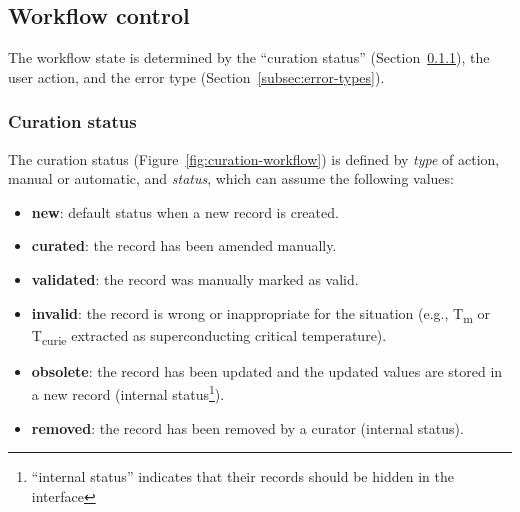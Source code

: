\documentclass[]{interact}
\theoremstyle{plain} %
\theoremstyle{definition}
\theoremstyle{remark}
\begin{document}


\subsection{Workflow control}
\label{subsec:workflow-control}
The workflow state is determined by the ``curation status'' (Section~\ref{subsec:curation-status}), the user action, and the error type (Section~\ref{subsec:error-types}).

\subsubsection{Curation status} 
\label{subsec:curation-status}
The curation status (Figure~\ref{fig:curation-workflow}) is defined by \emph{type} of action, manual or automatic, and \emph{status}, which can assume the following values: 
\begin{itemize}
    \item \textbf{new}: default status when a new record is created.
    \item \textbf{curated}: the record has been amended manually.
    \item \textbf{validated}: the record was manually marked as valid.
    \item \textbf{invalid}: the record is wrong or inappropriate for the situation (e.g., T\textsubscript{m} or T\textsubscript{curie} extracted as superconducting critical temperature).
    \item \textbf{obsolete}: the record has been updated and the updated values are stored in a new record (internal status\footnote{``internal status'' indicates that their records should be hidden in the interface}).
    \item \textbf{removed}: the record has been removed by a curator (internal status).
\end{itemize} 
    

\end{document}

